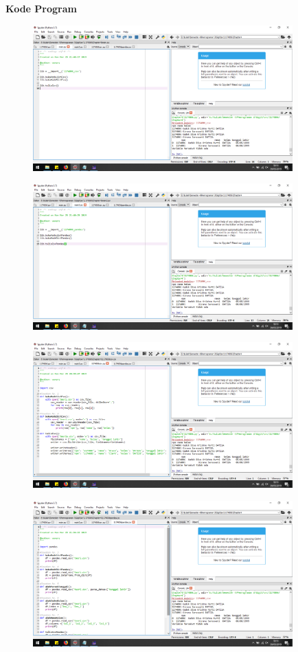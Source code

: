 \textbf{Kode Program}
\begin{figure}[H]
	\includegraphics[width=10cm]{figures/diva/Chapter4/harikedua/k1.png}
	\centering
\end{figure}
\begin{figure}[H]
	\includegraphics[width=10cm]{figures/diva/Chapter4/harikedua/k2.png}
	\centering
\end{figure}
\begin{figure}[H]
	\includegraphics[width=10cm]{figures/diva/Chapter4/harikedua/k3.png}
	\centering
\end{figure}
\begin{figure}[H]
	\includegraphics[width=10cm]{figures/diva/Chapter4/harikedua/k4.png}
	\centering
\end{figure}
